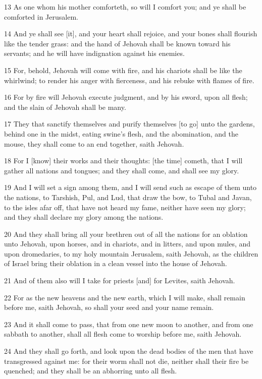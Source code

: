 \par 13 As one whom his mother comforteth, so will I comfort you; and ye shall be comforted in Jerusalem.
\par 14 And ye shall see [it], and your heart shall rejoice, and your bones shall flourish like the tender grass: and the hand of Jehovah shall be known toward his servants; and he will have indignation against his enemies.
\par 15 For, behold, Jehovah will come with fire, and his chariots shall be like the whirlwind; to render his anger with fierceness, and his rebuke with flames of fire.
\par 16 For by fire will Jehovah execute judgment, and by his sword, upon all flesh; and the slain of Jehovah shall be many.
\par 17 They that sanctify themselves and purify themselves [to go] unto the gardens, behind one in the midst, eating swine's flesh, and the abomination, and the mouse, they shall come to an end together, saith Jehovah.
\par 18 For I [know] their works and their thoughts: [the time] cometh, that I will gather all nations and tongues; and they shall come, and shall see my glory.
\par 19 And I will set a sign among them, and I will send such as escape of them unto the nations, to Tarshish, Pul, and Lud, that draw the bow, to Tubal and Javan, to the isles afar off, that have not heard my fame, neither have seen my glory; and they shall declare my glory among the nations.
\par 20 And they shall bring all your brethren out of all the nations for an oblation unto Jehovah, upon horses, and in chariots, and in litters, and upon mules, and upon dromedaries, to my holy mountain Jerusalem, saith Jehovah, as the children of Israel bring their oblation in a clean vessel into the house of Jehovah.
\par 21 And of them also will I take for priests [and] for Levites, saith Jehovah.
\par 22 For as the new heavens and the new earth, which I will make, shall remain before me, saith Jehovah, so shall your seed and your name remain.
\par 23 And it shall come to pass, that from one new moon to another, and from one sabbath to another, shall all flesh come to worship before me, saith Jehovah.
\par 24 And they shall go forth, and look upon the dead bodies of the men that have transgressed against me: for their worm shall not die, neither shall their fire be quenched; and they shall be an abhorring unto all flesh.

